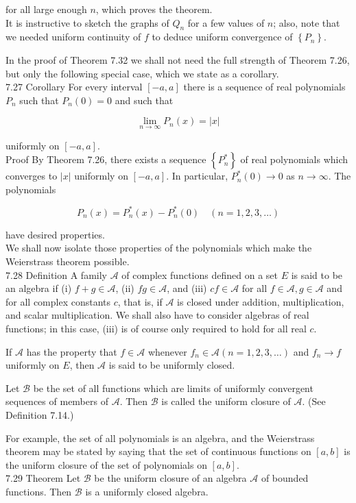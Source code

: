 \documentclass[10pt]{article}
\begin{document}
for all large enough $n$, which proves the theorem.\\
It is instructive to sketch the graphs of $Q_{n}$ for a few values of $n$; also, note that we needed uniform continuity of $f$ to deduce uniform convergence of $\left\{P_{n}\right\}$.

In the proof of Theorem 7.32 we shall not need the full strength of Theorem 7.26, but only the following special case, which we state as a corollary.\\
7.27 Corollary For every interval $[-a, a]$ there is a sequence of real polynomials $P_{n}$ such that $P_{n}(0)=0$ and such that

$$
\lim _{n \rightarrow \infty} P_{n}(x)=|x|
$$

uniformly on $[-a, a]$.\\
Proof By Theorem 7.26, there exists a sequence $\left\{P_{n}^{*}\right\}$ of real polynomials which converges to $|x|$ uniformly on $[-a, a]$. In particular, $P_{n}^{*}(0) \rightarrow 0$ as $n \rightarrow \infty$. The polynomials

$$
P_{n}(x)=P_{n}^{*}(x)-P_{n}^{*}(0) \quad(n=1,2,3, \ldots)
$$

have desired properties.\\
We shall now isolate those properties of the polynomials which make the Weierstrass theorem possible.\\
7.28 Definition A family $\mathscr{A}$ of complex functions defined on a set $E$ is said to be an algebra if (i) $f+g \in \mathscr{A}$, (ii) $f g \in \mathscr{A}$, and (iii) $c f \in \mathscr{A}$ for all $f \in \mathscr{A}, g \in \mathscr{A}$ and for all complex constants $c$, that is, if $\mathscr{A}$ is closed under addition, multiplication, and scalar multiplication. We shall also have to consider algebras of real functions; in this case, (iii) is of course only required to hold for all real $c$.

If $\mathscr{A}$ has the property that $f \in \mathscr{A}$ whenever $f_{n} \in \mathscr{A}(n=1,2,3, \ldots)$ and $f_{n} \rightarrow f$ uniformly on $E$, then $\mathscr{A}$ is said to be uniformly closed.

Let $\mathscr{B}$ be the set of all functions which are limits of uniformly convergent sequences of members of $\mathscr{A}$. Then $\mathscr{B}$ is called the uniform closure of $\mathscr{A}$. (See Definition 7.14.)

For example, the set of all polynomials is an algebra, and the Weierstrass theorem may be stated by saying that the set of continuous functions on $[a, b]$ is the uniform closure of the set of polynomials on $[a, b]$.\\
7.29 Theorem Let $\mathscr{B}$ be the uniform closure of an algebra $\mathscr{A}$ of bounded functions. Then $\mathscr{B}$ is a uniformly closed algebra.
\end{document}
